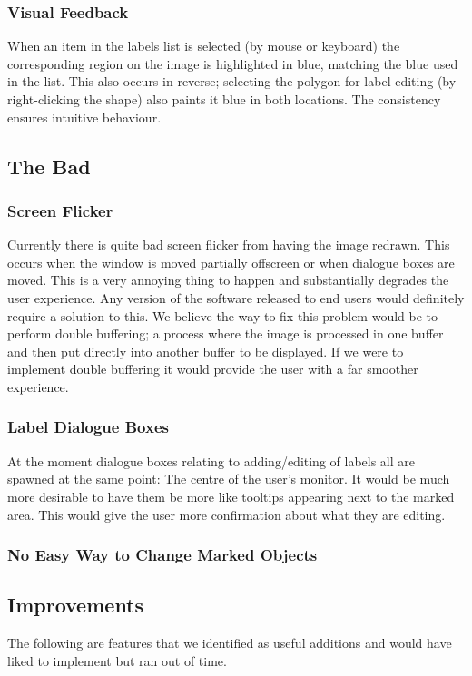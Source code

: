 \documentclass[a4paper,11pt,oneside]{article}
\begin{document}
\subsubsection{Visual Feedback}
When an item in the labels list is selected (by mouse or keyboard) the
corresponding region on the image is highlighted in blue, matching the blue
used in the list. This also occurs in reverse; selecting the polygon for label
editing (by right-clicking the shape) also paints it blue in both locations.
The consistency ensures intuitive behaviour.

\subsection{The Bad}
\subsubsection{Screen Flicker}
Currently there is quite bad screen flicker from having the image redrawn.  This
occurs when the window is moved partially offscreen or when dialogue boxes are
moved.  This is a very annoying thing to happen and substantially degrades the
user experience. Any version of the software released to end users would
definitely require a solution to this.  We believe the way to fix this problem
would be to perform double buffering; a process where the image is processed in
one buffer and then put directly into another buffer to be displayed.  If we
were to implement double buffering it would provide the user with a far smoother
experience.
\subsubsection{Label Dialogue Boxes}
At the moment dialogue boxes relating to adding/editing of labels all are
spawned at the same point: The centre of the user's monitor.  It would be much
more desirable to have them be more like tooltips appearing next to the marked
area.  This would give the user more confirmation about what they are editing.

\subsubsection{No Easy Way to Change Marked Objects}

\subsection{Improvements}
The following are features that we identified as useful additions and would have
liked to implement but ran out of time.
\end{document}
